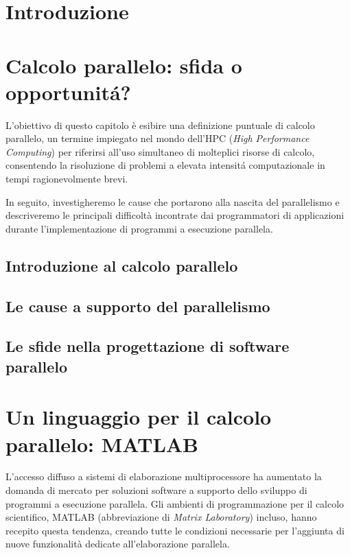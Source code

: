 \documentclass[
	a4paper,
	twoside,
	12pt
]{book}
\theoremstyle{StileEsempio}
\begin{document}
\frontmatter

\tableofcontents
\mainmatter
\chapter*{Introduzione}

\chapter{Calcolo parallelo: sfida o opportunit\'a?}
\label{cap1}
L'obiettivo di questo capitolo \`e esibire una definizione puntuale di calcolo parallelo, un termine impiegato nel mondo
dell'HPC (\textit{High Performance Computing}) per riferirsi all’uso simultaneo di molteplici risorse di calcolo, consentendo la risoluzione di problemi a
elevata intensit\'a computazionale in tempi ragionevolmente brevi.

In seguito, investigheremo le cause che portarono alla nascita del parallelismo e descriveremo le principali difficolt\`a incontrate dai programmatori di
applicazioni durante l'implementazione di programmi a esecuzione parallela.
\section{Introduzione al calcolo parallelo}
\label{par1.1}

\section{Le cause a supporto del parallelismo}
\label{par1.2}

\section{Le sfide nella progettazione di software parallelo}
\label{par1.3}

\chapter{Un linguaggio per il calcolo parallelo: MATLAB}
\label{cap2}
L'accesso diffuso a sistemi di elaborazione multiprocessore ha aumentato
la domanda di mercato per soluzioni software a supporto dello sviluppo di programmi a esecuzione parallela. \newline
Gli ambienti di programmazione per il calcolo scientifico, MATLAB (abbreviazione di \textit{Matrix Laboratory}) incluso, hanno recepito questa tendenza,
creando tutte le condizioni necessarie per l'aggiunta di nuove funzionalit\`a dedicate all'elaborazione parallela.
\end{document}
